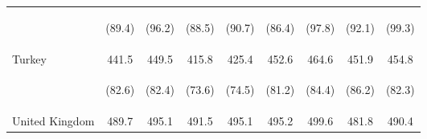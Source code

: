 \begin{center}
\begin{tabular}{lcccccccc}
 & \begin{footnotesize}(89.4)\end{footnotesize} & \begin{footnotesize}(96.2)\end{footnotesize} & \begin{footnotesize}(88.5)\end{footnotesize} & \begin{footnotesize}(90.7)\end{footnotesize} & \begin{footnotesize}(86.4)\end{footnotesize} & \begin{footnotesize}(97.8)\end{footnotesize} & \begin{footnotesize}(92.1)\end{footnotesize} & \begin{footnotesize}(99.3)\end{footnotesize}\\
\noalign{\smallskip}Turkey & 441.5 & 449.5 & 415.8 & 425.4 & 452.6 & 464.6 & 451.9 & 454.8\\
 & \begin{footnotesize}(82.6)\end{footnotesize} & \begin{footnotesize}(82.4)\end{footnotesize} & \begin{footnotesize}(73.6)\end{footnotesize} & \begin{footnotesize}(74.5)\end{footnotesize} & \begin{footnotesize}(81.2)\end{footnotesize} & \begin{footnotesize}(84.4)\end{footnotesize} & \begin{footnotesize}(86.2)\end{footnotesize} & \begin{footnotesize}(82.3)\end{footnotesize}\\
\noalign{\smallskip}United Kingdom & 489.7 & 495.1 & 491.5 & 495.1 & 495.2 & 499.6 & 481.8 & 490.4\\

\end{tabular}
\end{center}
